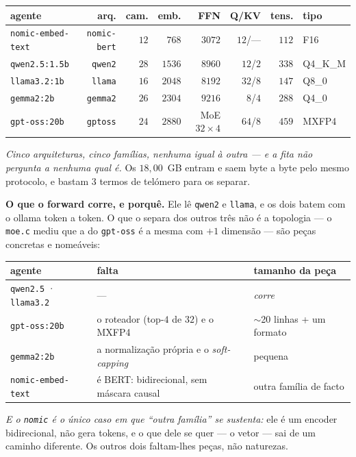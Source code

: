 \documentclass[11pt]{article}
\newcommand{\code}[1]{\texttt{\small #1}}
\theoremstyle{plain}
\theoremstyle{remark}
\begin{document}
\begin{itemize}
\begin{center}\small
\begin{tabular}{lrrrrrrl}
agente & arq. & cam. & emb. & FFN & Q/KV & tens. & tipo \\ \hline
\code{nomic-embed-text} & \code{nomic-bert} & $12$ & $768$ & $3072$ & $12$/--- & $112$ & F16 \\
\code{qwen2.5:1.5b} & \code{qwen2} & $28$ & $1536$ & $8960$ & $12$/$2$ & $338$ & Q4\_K\_M \\
\code{llama3.2:1b} & \code{llama} & $16$ & $2048$ & $8192$ & $32$/$8$ & $147$ & Q8\_0 \\
\code{gemma2:2b} & \code{gemma2} & $26$ & $2304$ & $9216$ & $8$/$4$ & $288$ & Q4\_0 \\
\code{gpt-oss:20b} & \code{gptoss} & $24$ & $2880$ & MoE $32{\times}4$ & $64$/$8$ & $459$ & MXFP4 \\
\end{tabular}
\end{center}

\emph{Cinco arquiteturas, cinco famílias, nenhuma igual à outra --- e a fita não pergunta a nenhuma
qual é.} Os $18{,}00$~GB entram e saem byte a byte pelo mesmo protocolo, e bastam $3$ termos de
telómero para os separar.

\textbf{O que o forward corre, e porquê.} Ele lê \code{qwen2} e \code{llama}, e os dois batem com o
ollama token a token. O que o separa dos outros três não é a topologia --- o \code{moe.c} mediu que
a do \code{gpt-oss} é a mesma com $+1$ dimensão --- são peças concretas e nomeáveis:

\begin{center}\small
\begin{tabular}{lll}
agente & falta & tamanho da peça \\ \hline
\code{qwen2.5} · \code{llama3.2} & --- & \emph{corre} \\
\code{gpt-oss:20b} & o roteador (top-$4$ de $32$) e o MXFP4 & $\sim$20 linhas + um formato \\
\code{gemma2:2b} & a normalização própria e o \emph{soft-capping} & pequena \\
\code{nomic-embed-text} & é BERT: bidirecional, sem máscara causal & outra família de facto \\
\end{tabular}
\end{center}

\emph{E o \code{nomic} é o único caso em que ``outra família'' se sustenta:} ele é um encoder
bidirecional, não gera tokens, e o que dele se quer --- o vetor --- sai de um caminho diferente. Os
outros dois faltam-lhes peças, não naturezas.


\end{itemize}
\end{document}
